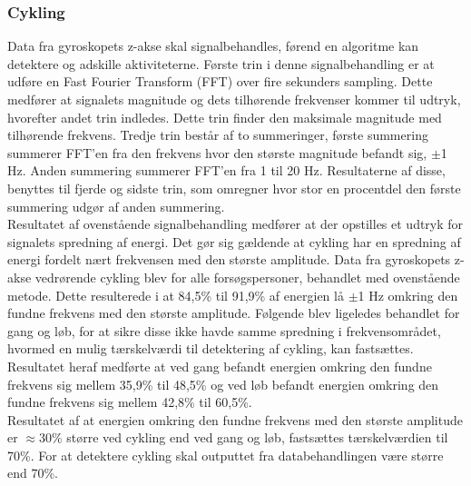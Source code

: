 \subsubsection{Cykling}
Data fra gyroskopets z-akse skal signalbehandles, førend en algoritme kan detektere og adskille aktiviteterne. Første trin i denne signalbehandling er at udføre en Fast Fourier Transform (FFT) over fire sekunders sampling. Dette medfører at signalets magnitude og dets tilhørende frekvenser kommer til udtryk, hvorefter andet trin indledes. Dette trin finder den maksimale magnitude med tilhørende frekvens. Tredje trin består af to summeringer, første summering summerer FFT'en fra den frekvens hvor den største magnitude befandt sig, $\pm$1 Hz. Anden summering summerer FFT'en fra 1 til 20 Hz. Resultaterne af disse, benyttes til fjerde og sidste trin, som omregner hvor stor en procentdel den første summering udgør af anden summering. \\
Resultatet af ovenstående signalbehandling medfører at der opstilles et udtryk for signalets spredning af energi. Det gør sig gældende at cykling har en spredning af energi fordelt nært frekvensen med den største amplitude. Data fra gyroskopets z-akse vedrørende cykling blev for alle forsøgspersoner, behandlet med ovenstående metode. Dette resulterede i at 84,5\% til 91,9\% af energien lå $\pm$1 Hz omkring den fundne frekvens med den største amplitude. Følgende blev ligeledes behandlet for gang og løb, for at sikre disse ikke havde samme spredning i frekvensområdet, hvormed en mulig tærskelværdi til detektering af cykling, kan fastsættes. Resultatet heraf medførte at ved gang befandt energien omkring den fundne frekvens sig mellem 35,9\% til 48,5\% og ved løb befandt energien omkring den fundne frekvens sig mellem 42,8\% til 60,5\%. \\
Resultatet af at energien omkring den fundne frekvens med den største amplitude er $\approx$30\% større ved cykling end ved gang og løb, fastsættes tærskelværdien til 70\%. For at detektere cykling skal outputtet fra databehandlingen være større end 70\%.

